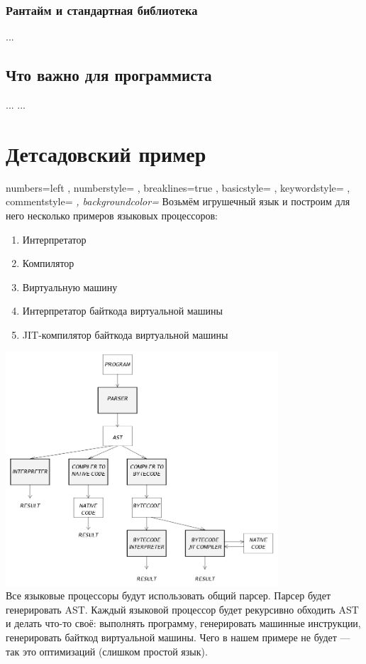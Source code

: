 \documentclass[11pt]{book}
\begin{document}
\subsection{Рантайм и стандартная библиотека}
...
\section{Что важно для программиста}
...
...
\chapter{Детсадовский пример}
    { numbers=left
    , numberstyle=\footnotesize\ttfamily\color{cblue3}
    , breaklines=true
    , basicstyle=\footnotesize\ttfamily\color{cblue1}
    , keywordstyle=\footnotesize\ttfamily\color{cblue2}
    , commentstyle=\itshape\color{cgreen}
    , backgroundcolor=\color{cgray}
    }
\lstset{style=src}
Возьмём игрушечный язык и построим для него несколько примеров языковых процессоров:
\begin{enumerate}
\item Интерпретатор
\item Компилятор
\item Виртуальную машину
\item Интерпретатор байткода виртуальной машины
\item JIT-компилятор байткода виртуальной машины
\end{enumerate}
\includegraphics[width=4in]{pic/scheme.png}
\\
Все языковые процессоры будут использовать общий парсер.
Парсер будет генерировать AST.
Каждый языковой процессор будет рекурсивно обходить AST и делать что-то своё:
выполнять программу, генерировать машинные инструкции, генерировать байткод виртуальной машины.
Чего в нашем примере не будет --- так это оптимизаций (слишком простой язык).
\end{document}
